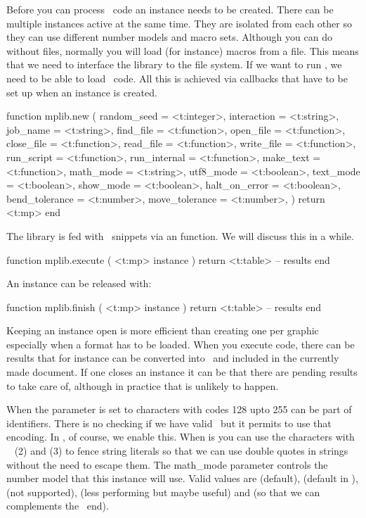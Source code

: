 Before you can process \METAPOST\ code an instance needs to be created. There can
be multiple instances active at the same time. They are isolated from each other
so they can use different number models and macro sets. Although you can do
without files, normally you will load (for instance) macros from a file. This
means that we need to interface the library to the file system. If we want to run
\LUA, we need to be able to load \LUA\ code. All this is achieved via callbacks
that have to be set up when an instance is created.

\starttyping[option=LUA]
function mplib.new (
    {
        random_seed    = <t:integer>,
        interaction    = <t:string>,
        job_name       = <t:string>,
        find_file      = <t:function>,
        open_file      = <t:function>,
        close_file     = <t:function>,
        read_file      = <t:function>,
        write_file     = <t:function>,
        run_script     = <t:function>,
        run_internal   = <t:function>,
        make_text      = <t:function>,
        math_mode      = <t:string>,
        utf8_mode      = <t:boolean>,
        text_mode      = <t:boolean>,
        show_mode      = <t:boolean>,
        halt_on_error  = <t:boolean>,
        bend_tolerance = <t:number>,
        move_tolerance = <t:number>,
    }
)
    return <t:mp>
end
\stoptyping

The library is fed with \METAPOST\ snippets via an  function. We
will discuss this in a while.

\starttyping[option=LUA]
function mplib.execute ( <t:mp> instance )
    return <t:table> -- results
end
\stoptyping

An instance can be released with:

\starttyping[option=LUA]
function mplib.finish ( <t:mp> instance )
    return <t:table> -- results
end
\stoptyping

Keeping an instance open is more efficient than creating one per graphic
especially when a format has to be loaded. When you execute code, there can be
results that for instance can be converted into \PDF\ and included in the
currently made document. If one closes an instance it can be that there are
pending results to take care of, although in practice that is unlikely to happen.

When the  parameter is set to  characters with codes
128 upto 255 can be part of identifiers. There is no checking if we have valid
\UTF\ but it permits to use that encoding. In \CONTEXT, of course, we enable
this. When  is  you can use the characters with
\ASCII\  (2) and  (3) to fence string literals so that we
can use double quotes in strings without the need to escape them. The \type
{math_mode} parameter controls the number model that this instance will use.
Valid values are  (default),  (default in \CONTEXT),
 (not supported),  (less performing but maybe
useful) and  (so that we can complements the \TEX\ end).

